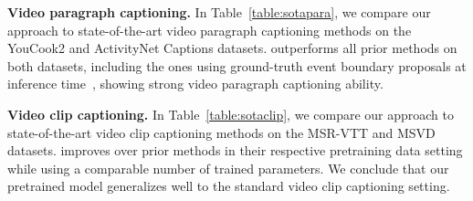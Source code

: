 \begin{table}[t]
\begin{center}
\setlength\tabcolsep{1pt}
\end{center}
\vspace{-0.6cm}
\caption{\small Comparison to the SoTA for video clip captioning.
* indicates results re-evaluated by the same evaluation toolkit.
}
\vspace{-0.4cm}
\label{table:sotaclip}
\end{table}

\noindent \textbf{Video paragraph captioning.} 
In Table~\ref{table:sotapara}, we compare our approach to state-of-the-art video paragraph captioning methods on the YouCook2 and ActivityNet Captions datasets.
\model{} outperforms all prior methods on both datasets, including the ones using ground-truth event boundary proposals at inference time~\cite{dai2019transformer, lei2020mart, zhou2018end, zhou2019grounded, wang2021end, park2019adversarial}, showing strong video paragraph captioning ability.

\noindent \textbf{Video clip captioning.} 
In Table~\ref{table:sotaclip}, we compare our approach to state-of-the-art video clip captioning methods on the MSR-VTT and MSVD datasets.
\model{} improves over prior methods in their respective pretraining data setting while using a comparable number of trained parameters.
We conclude that our pretrained \model{} model generalizes well to the standard video clip captioning setting.


